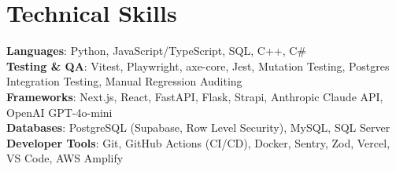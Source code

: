 \documentclass[letterpaper,11pt]{article}
\begin{document}
\section{Technical Skills}
 \begin{itemize}[leftmargin=0.15in, label={}]
    \small{\item{
     \textbf{Languages}{: Python, JavaScript/TypeScript, SQL, C++, C\#} \\
     \textbf{Testing \& QA}{: Vitest, Playwright, axe-core, Jest, Mutation Testing, Postgres Integration Testing, Manual Regression Auditing} \\
     \textbf{Frameworks}{: Next.js, React, FastAPI, Flask, Strapi, Anthropic Claude API, OpenAI GPT-4o-mini} \\
     \textbf{Databases}{: PostgreSQL (Supabase, Row Level Security), MySQL, SQL Server} \\
     \textbf{Developer Tools}{: Git, GitHub Actions (CI/CD), Docker, Sentry, Zod, Vercel, VS Code, AWS Amplify}
    }}
 \end{itemize}


\end{document}
